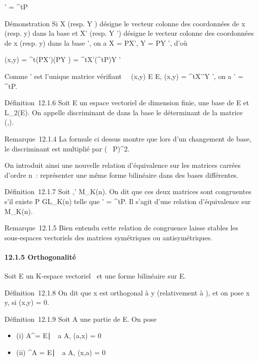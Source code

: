 \documentclass[]{article}
\begin{document}
\Omega' = ^tP\OmegaP

Démonstration Si X (resp. Y ) désigne le vecteur colonne des coordonnées
de x (resp. y) dans la base  et X' (resp. Y ') désigne le vecteur
colonne des coordonnées de x (resp. y) dans la base ', on a X = PX', Y
= PY ', d'où

\phi(x,y) = ^t(PX')\Omega(PY ) = ^tX'(^tP\OmegaP)Y '

Comme \Omega' est l'unique matrice vérifiant \forall~~(x,y)
\in E \times E, \phi(x,y) = ^tX'\Omega'Y ', on a \Omega' = ^tP\OmegaP.

Définition~12.1.6 Soit E un espace vectoriel de dimension finie,  une
base de E et \phi \in L_2(E). On appelle discriminant de \phi dans la
base  le déterminant de la matrice
\mathrmMat~ (\phi,).

Remarque~12.1.4 La formule ci dessus montre que lors d'un changement de
base, le discriminant est multiplié par
(~
P)^2.

On introduit ainsi une nouvelle relation d'équivalence sur les matrices
carrées d'ordre n~: représenter une même forme bilinéaire dans des bases
différentes.

Définition~12.1.7 Soit \Omega,\Omega' \in M_K(n). On dit que ces deux
matrices sont congruentes s'il existe P \in GL_K(n) telle que \Omega'
= ^tP\OmegaP. Il s'agit d'une relation d'équivalence sur
M_K(n).

Remarque~12.1.5 Bien entendu cette relation de congruence laisse stables
les sous-espaces vectoriels des matrices symétriques ou antisymétriques.

\paragraph{12.1.5 Orthogonalité}

Soit E un K-espace vectoriel ~et \phi une forme bilinéaire sur E.

Définition~12.1.8 On dit que x est orthogonal à y (relativement à \phi), et
on pose x \bot y, si \phi(x,y) = 0.

Définition~12.1.9 Soit A une partie de E. On pose

\begin{itemize}
\itemsep1pt\parskip0pt
\item
  (i) A^\bot = \x \in
  E∣\forall~~a \in A, \phi(a,x)
  = 0\
\item
  (ii) ^\bot A = \x \in
  E∣\forall~~a \in A, \phi(x,a)
  = 0\
\end{itemize}
\end{document}
